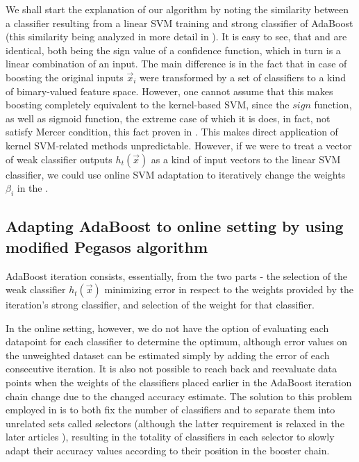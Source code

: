 We shall start the explanation of our algorithm by noting the similarity between a classifier resulting from a linear SVM training and strong classifier of AdaBoost (this similarity being analyzed in more detail in \cite{Boostsvm}). It is easy to see, that  and are identical, both being the sign value of a confidence function, which in turn is a linear combination of an input. The main difference is in the fact that in case of boosting the original inputs $\vec{x}_i$ were transformed by a set of classifiers to a kind of bimary-valued feature space. However, one cannot assume that this makes boosting completely equivalent to the kernel-based SVM, since the $sign$ function, as well as sigmoid function, the extreme case of which it is does, in fact, not satisfy Mercer condition, this fact proven in \cite{smola2001}. This makes direct application of kernel SVM-related methods unpredictable. However, if we were to treat a vector of weak classifier outputs $h_t(\vec{x})$ as a kind of input vectors to the linear SVM classifier, we could use online SVM adaptation to iteratively change the weights $\beta_i$ in the  .


\subsection{Adapting AdaBoost to online setting by using modified Pegasos algorithm}

AdaBoost iteration consists, essentially, from the two parts - the selection of the weak classifier $h_t(\vec{x})$ minimizing error in respect to the weights provided by the iteration's strong classifier, and selection of the weight for that classifier. 

In the online setting, however, we do not have the option of evaluating each datapoint for each classifier to determine the optimum, although error values on the unweighted dataset can be estimated simply by adding the error of each consecutive iteration. It is also not possible to reach back and reevaluate data points when the weights of the classifiers placed earlier in the AdaBoost iteration chain change due to the changed accuracy estimate. The solution to this problem employed in \cite{OnlineBoost} is to both fix the number of classifiers and to separate them into unrelated sets called selectors (although the latter requirement is relaxed in the later articles \cite{grabner2009}), resulting in the totality of classifiers in each selector to slowly adapt their accuracy values according to their position in the booster chain.

